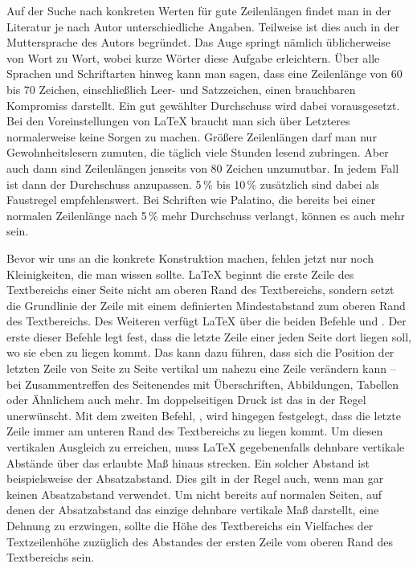 \begin{Explain}
  Auf der Suche nach konkreten Werten für gute
  Zeilenlängen findet man in der
  Literatur je nach Autor unterschiedliche Angaben. Teilweise ist dies auch in
  der Muttersprache des Autors begründet. Das Auge springt nämlich
  üblicherweise von Wort zu Wort, wobei kurze Wörter diese Aufgabe
  erleichtern. Über alle Sprachen und Schriftarten hinweg kann man sagen, dass
  eine Zeilenlänge von 60 bis 70 Zeichen, einschließlich Leer- und
  Satzzeichen, einen brauchbaren Kompromiss darstellt. Ein gut gewählter
  Durchschuss wird dabei vorausgesetzt. Bei den Voreinstellungen von \LaTeX{}
  braucht man sich über Letzteres normalerweise keine Sorgen zu
  machen. Größere Zeilenlängen darf man nur Gewohnheitslesern zumuten, die
  täglich viele Stunden lesend zubringen. Aber auch dann sind Zeilenlängen
  jenseits von 80 Zeichen unzumutbar. In jedem Fall ist dann der Durchschuss
  anzupassen. 5\,\% bis 10\,\% zusätzlich sind dabei als Faustregel
  empfehlenswert. Bei Schriften wie Palatino, die bereits bei einer normalen
  Zeilenlänge nach 5\,\% mehr Durchschuss verlangt, können es auch mehr sein.
  
  Bevor wir uns an die konkrete Konstruktion machen, fehlen jetzt nur noch
  Kleinigkeiten, die man wissen sollte. \LaTeX{} beginnt die erste Zeile des
  Textbereichs einer Seite nicht am oberen Rand des Textbereichs, sondern
  setzt die Grundlinie der Zeile mit einem definierten Mindestabstand zum
  oberen Rand des Textbereichs. Des Weiteren verfügt \LaTeX{} über die beiden
  Befehle  und
  . Der erste dieser
  Befehle legt fest, dass die letzte Zeile einer jeden Seite dort liegen soll,
  wo sie eben zu liegen kommt. Das kann dazu führen, dass sich die Position
  der letzten Zeile von Seite zu Seite vertikal um nahezu eine Zeile verändern
  kann -- bei Zusammentreffen des Seitenendes mit Überschriften, Abbildungen,
  Tabellen oder Ähnlichem auch mehr. Im doppelseitigen Druck ist das in der
  Regel unerwünscht. Mit dem zweiten Befehl,
  , wird hingegen festgelegt, dass die letzte
  Zeile immer am unteren Rand des Textbereichs zu liegen kommt. Um diesen
  vertikalen Ausgleich zu erreichen, muss \LaTeX{} gegebenenfalls dehnbare
  vertikale Abstände über das erlaubte Maß hinaus strecken. Ein solcher
  Abstand ist beispielsweise der Absatzabstand. Dies gilt in der Regel auch,
  wenn man gar keinen Absatzabstand verwendet. Um nicht bereits auf normalen
  Seiten, auf denen der Absatzabstand das einzige dehnbare vertikale Maß
  darstellt, eine Dehnung zu erzwingen, sollte die Höhe des Textbereichs ein
  Vielfaches der Textzeilenhöhe zuzüglich des Abstandes der ersten Zeile vom
  oberen Rand des Textbereichs sein.


\end{Explain}
